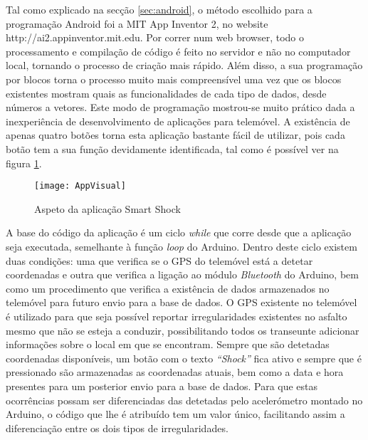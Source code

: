 Tal como explicado na secção \ref{sec:android}, o método escolhido para a programação Android foi a MIT App Inventor 2, no website http://ai2.appinventor.mit.edu.
Por correr num web browser, todo o processamento e compilação de código é feito no servidor e não no computador local, tornando o processo de criação mais rápido.
Além disso, a sua programação por blocos torna o processo muito mais compreensível uma vez que os blocos existentes mostram quais as funcionalidades de cada tipo de dados, desde números a vetores.
Este modo de programação mostrou-se muito prático dada a inexperiência de desenvolvimento de aplicações para telemóvel.
A existência de apenas quatro botões torna esta aplicação bastante fácil de utilizar, pois cada botão tem a sua função devidamente identificada, tal como é possível ver na figura \ref{fig:Aspeto_da_aplicação_Smart_Shock}.


\begin{figure}[!htbp]
	\centering
	\texttt{[image: AppVisual]}
	\caption{Aspeto da aplicação Smart Shock}
	\label{fig:Aspeto_da_aplicação_Smart_Shock}
\end{figure}

A base do código da aplicação é um ciclo \emph{while} que corre desde que a aplicação seja executada, semelhante à função \emph{loop} do Arduino.
Dentro deste ciclo existem duas condições: uma que verifica se o GPS do telemóvel está a detetar coordenadas e outra que verifica a ligação ao módulo \emph{Bluetooth} do Arduino, bem como um procedimento que verifica a existência de dados armazenados no telemóvel para futuro envio para a base de dados.
O GPS existente no telemóvel é utilizado para que seja possível reportar irregularidades existentes no asfalto mesmo que não se esteja a conduzir, possibilitando todos os transeunte adicionar informações sobre o local em que se encontram.
Sempre que são detetadas coordenadas disponíveis, um botão com o texto \emph{``Shock''} fica ativo e sempre que é pressionado são armazenadas as coordenadas atuais, bem como a data e hora presentes para um posterior envio para a base de dados.
Para que estas ocorrências possam ser diferenciadas das detetadas pelo acelerómetro montado no Arduino, o código que lhe é atribuído tem um valor único, facilitando assim a diferenciação entre os dois tipos de irregularidades.

